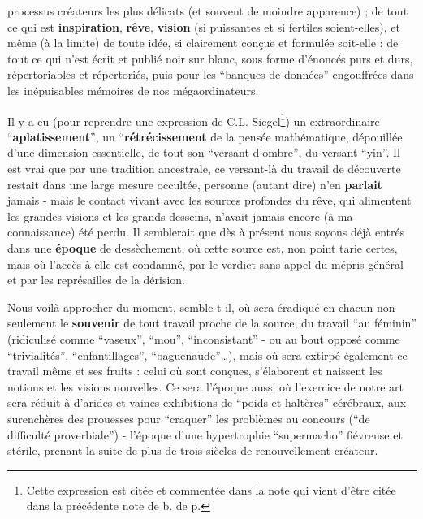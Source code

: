 processus créateurs les plus délicats (et souvent de moindre apparence) ; de tout ce qui est \textbf{inspiration}, \textbf{rêve}, \textbf{vision} (si puissantes et si fertiles soient-elles), et même (à la limite) de toute idée, si clairement conçue et formulée soit-elle : de tout ce qui n'est écrit et publié noir sur blanc, sous forme d'énoncés purs et durs, répertoriables et répertoriés, puis pour les ``banques de données'' engouffrées dans les inépuisables mémoires de nos mégaordinateurs.

Il y a eu (pour reprendre une expression de C.L. Siegel\footnote{Cette expression est citée et commentée dans la note qui vient d'être citée dans la précédente note de b. de p.}) un extraordinaire ``\textbf{aplatissement}'', un ``\textbf{rétrécissement} de la pensée mathématique, dépouillée d'une dimension essentielle, de tout son ``versant d'ombre'', du versant ``yin''. Il est vrai que par une tradition ancestrale, ce versant-là du travail de découverte restait dans une large mesure occultée, personne (autant dire) n'en \textbf{parlait} jamais - mais le contact vivant avec les sources profondes du rêve, qui alimentent les grandes visions et les grands desseins, n'avait jamais encore (à ma connaissance) été perdu. Il semblerait que dès à présent nous soyons déjà entrés dans une \textbf{époque} de dessèchement, où cette source est, non point tarie certes, mais où l'accès à elle est condamné, par le verdict sans appel du mépris général et par les représailles de la dérision.

Nous voilà approcher du moment, semble-t-il, où sera éradiqué en chacun non seulement le \textbf{souvenir} de tout travail proche de la source, du travail ``au féminin'' (ridiculisé comme ``vaseux'', ``mou'', ``inconsistant'' - ou au bout opposé comme ``trivialités'', ``enfantillages'', ``baguenaude''\ldots), mais où sera extirpé également ce travail même et ses fruits : celui où sont conçues, s'élaborent et naissent les notions et les visions nouvelles. Ce sera l'époque aussi où l'exercice de notre art sera réduit à d'arides et vaines exhibitions de ``poids et haltères'' cérébraux, aux surenchères des prouesses pour ``craquer'' les problèmes au concours (``de difficulté proverbiale'') - l'époque d'une hypertrophie ``supermacho'' fiévreuse et stérile, prenant la suite de plus de trois siècles de renouvellement créateur.

